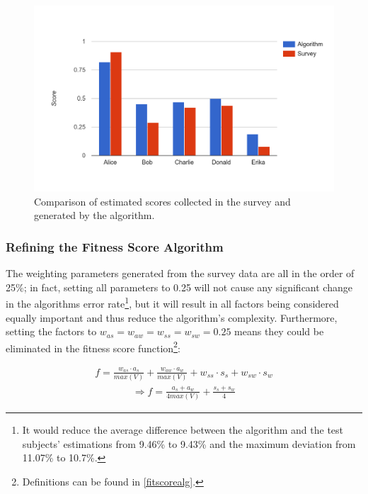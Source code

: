 \begin{figure}[H]
    \centering
    \includegraphics[width=\textwidth]{images/survey_vs_alg.png}
    \caption[Diagram: Comparison of Survey and Algorithm]{Comparison of estimated scores collected in the survey and generated by the algorithm.}
    \label{survey:compare}
\end{figure}


\newpage

\subsubsection{Refining the Fitness Score Algorithm}
The weighting parameters generated from the survey data are all in the order of 25\%; in fact, setting all parameters to 0.25 will not cause any significant change in the algorithms error rate\footnote{It would reduce the average difference between the algorithm and the test subjects' estimations from 9.46\% to 9.43\% and the maximum deviation from 11.07\% to 10.7\%.}, but it will result in all factors being considered equally important and thus reduce the algorithm's complexity.
Furthermore, setting the factors to $w_{as} = w_{aw} = w_{ss} = w_{sw} = 0.25$ means they could be eliminated in the fitness score function\footnote{Definitions can be found in \ref{fitscorealg}.}:

\begin{gather*}
  f = \frac{w_{as} \cdot a_s}{max(V)} + \frac{w_{aw} \cdot a_w}{max(V)} + w_{ss} \cdot s_s + w_{sw} \cdot s_w
\end{gather*}
\begin{gather*}
	\Rightarrow f = \frac{a_s + a_w}{4 max(V)} + \frac{s_s + s_w}{4}
\end{gather*}

